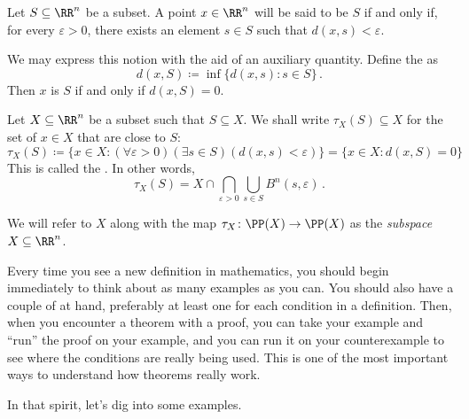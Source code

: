 \begin{dfn}
	Let $ S \subseteq \RR^n $ be a subset.
	A point $ x \in \RR^n $ will be said to be  $S$ if and only if, for every $ \varepsilon > 0 $, there exists an element $ s \in S $ such that $ d(x,s) < \varepsilon $.

	We may express this notion with the aid of an auxiliary quantity.
	Define the  as%
	\[
		d(x,S) \coloneq \inf \{ d(x,s) : s \in S \} \period
	\]
	Then $x$ is  $S$ if and only if $d(x,S) =0$.
	
	Let $ X \subseteq \RR^n$ be a subset such that $ S \subseteq X $.
	We shall write $ \tau_X(S) \subseteq X $ for the set of $ x \in X $ that are close to $ S $:
	\[
		\tau_X(S) \coloneq \{ x \in X : (\forall \varepsilon >0)(\exists s \in S)(d(x,s)<\varepsilon) \} = \{x \in X : d(x,S) = 0\}
	\]
	This is called the .
	In other words,
	\[
		\tau_X(S) = X \cap \bigcap_{\varepsilon>0}\bigcup_{s\in S} B^n(s,\varepsilon) \period
	\]

	We will refer to $X $ along with the map%
	$\tau_X \colon \PP(X) \to \PP(X) $ as the \emph{subspace} $X \subseteq \RR^n$.
\end{dfn}

Every time you see a new definition in mathematics, you should begin immediately to think about as many examples as you can.
You should also have a couple of  at hand, preferably at least one for each condition in a definition.
Then, when you encounter a theorem with a proof, you can take your example and \enquote{run} the proof on your example, and you can run it on your counterexample to see where the conditions are really being used.
This is one of the most important ways to understand how theorems really work.

In that spirit, let's dig into some examples.

